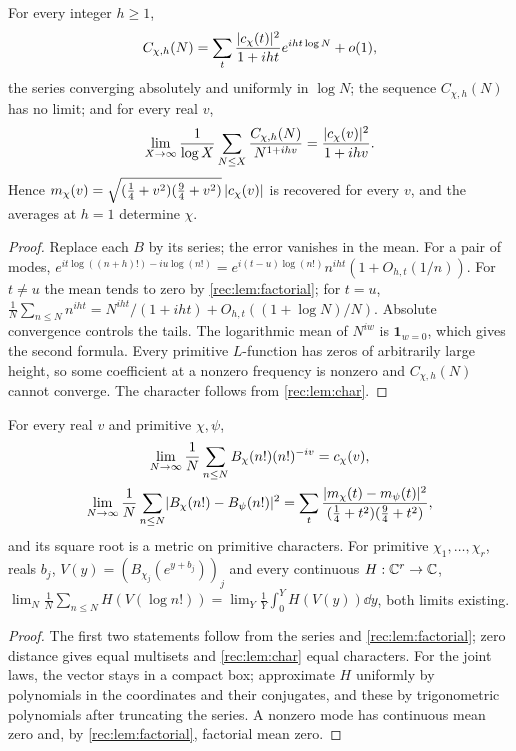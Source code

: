 \begin{theorem}\label{rec:thm:factorial}
For every integer $h\ge1$,
\[
 C_{\chi,h}(N)=\sum_t\frac{\lvert c_\chi(t)\rvert^2}{1+iht}e^{iht\log N}+o(1),
\]
the series converging absolutely and uniformly in $\log N$; the sequence $C_{\chi,h}(N)$ has no
limit; and for every real $v$,
\[
 \lim_{X\to\infty}\frac1{\log X}\sum_{N\le X}\frac{C_{\chi,h}(N)}{N^{1+ihv}}=\frac{\lvert c_\chi(v)\rvert^2}{1+ihv}.
\]
Hence $m_\chi(v)=\sqrt{(\tfrac14+v^2)(\tfrac94+v^2)}\,\lvert c_\chi(v)\rvert$ is recovered for every $v$, and
the averages at $h=1$ determine $\chi$.
\end{theorem}

\begin{proof}
Replace each $B$ by its series; the error vanishes in the mean. For a pair of modes,
$e^{it\log((n+h)!)-iu\log(n!)}=e^{i(t-u)\log(n!)}n^{iht}(1+O_{h,t}(1/n))$. For $t\ne u$ the mean
tends to zero by \cref{rec:lem:factorial}; for $t=u$,
$\frac1N\sum_{n\le N}n^{iht}=N^{iht}/(1+iht)+O_{h,t}((1+\log N)/N)$. Absolute convergence controls
the tails. The logarithmic mean of $N^{iw}$ is $\mathbf 1_{w=0}$, which gives the second formula. Every
primitive $L$-function has zeros of arbitrarily large height, so some coefficient at a nonzero
frequency is nonzero and $C_{\chi,h}(N)$ cannot converge. The character follows from
\cref{rec:lem:char}.
\end{proof}

\begin{corollary}\label{rec:cor:factorialjoint}
For every real $v$ and primitive $\chi,\psi$,
\begin{gather*}
 \lim_{N\to\infty}\frac1N\sum_{n\le N}B_\chi(n!)(n!)^{-iv}=c_\chi(v),\\
 \lim_{N\to\infty}\frac1N\sum_{n\le N}\lvert B_\chi(n!)-B_\psi(n!)\rvert^2
 =\sum_t\frac{\lvert m_\chi(t)-m_\psi(t)\rvert^2}{(\tfrac14+t^2)(\tfrac94+t^2)},
\end{gather*}
and its square root is a metric on primitive characters. For primitive $\chi_1,\dots,\chi_r$, reals
$b_j$, $V(y)=(B_{\chi_j}(e^{y+b_j}))_j$ and every continuous $H:\mathbb{C}^r\to\mathbb{C}$,
$\lim_N\frac1N\sum_{n\le N}H(V(\log n!))=\lim_Y\frac1Y\int_0^YH(V(y))\dd y$, both limits existing.
\end{corollary}

\begin{proof}
The first two statements follow from the series and \cref{rec:lem:factorial}; zero distance gives
equal multisets and \cref{rec:lem:char} equal characters. For the joint laws, the vector stays in a
compact box; approximate $H$ uniformly by polynomials in the coordinates and their conjugates, and
these by trigonometric polynomials after truncating the series. A nonzero mode has continuous mean
zero and, by \cref{rec:lem:factorial}, factorial mean zero.
\end{proof}

